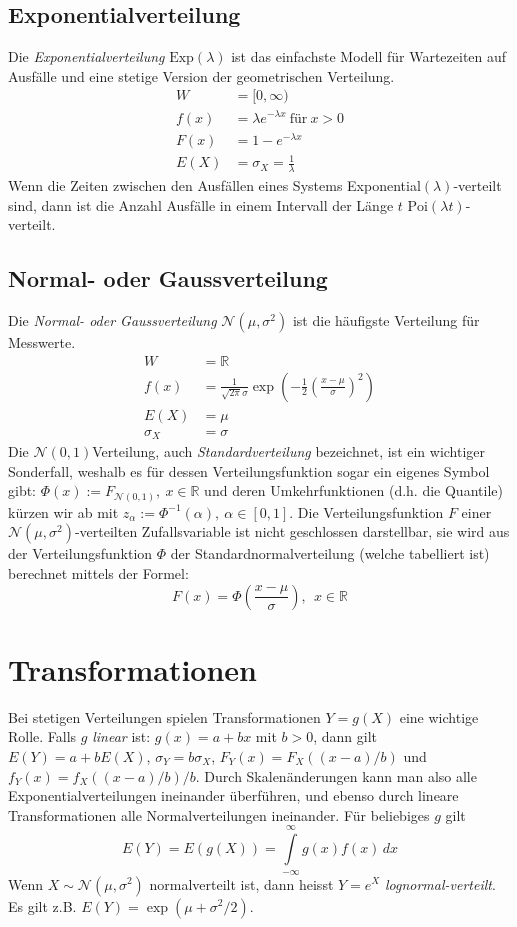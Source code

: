 \subsection{Exponentialverteilung}
Die \emph{Exponentialverteilung} $\text{Exp}(\lambda)$ ist das einfachste Modell für Wartezeiten auf Ausfälle und eine stetige Version der geometrischen Verteilung.
\begin{align}
	W&=[0,\infty)\\
	f(x)&=\lambda e^{-\lambda x} \ \text{für}\ x>0\\
	F(x)&=1-e^{-\lambda x}\\
	E(X)&=\sigma_X=\frac{1}{\lambda}
\end{align}
Wenn die Zeiten zwischen den Ausfällen eines Systems Exponential$(\lambda)$-verteilt sind, dann ist die Anzahl Ausfälle in einem Intervall der Länge $t$ $\text{Poi}(\lambda t)$-verteilt.
%
\subsection{Normal- oder Gaussverteilung}
Die \emph{Normal- oder Gaussverteilung} $\mathcal{N}(\mu,\sigma^2)$ ist die häufigste Verteilung für Messwerte.
\begin{align}
	W&=\mathbb{R}\\
	f(x)&=\frac{1}{\sqrt{2\pi}\sigma} \exp\left(-\frac{1}{2}\left(\frac{x-\mu}{\sigma}\right)^2\right)\\
	E(X)&=\mu\\
	\sigma_X&=\sigma
\end{align}
Die $\mathcal{N}(0,1)$Verteilung, auch \emph{Standardverteilung} bezeichnet, ist ein wichtiger Sonderfall, weshalb es für dessen Verteilungsfunktion sogar ein eigenes Symbol gibt: $\Phi(x) := F_{\mathcal{N}(0,1)}, \ x\in\mathbb{R}$ und deren Umkehrfunktionen (d.h. die Quantile) kürzen wir ab mit $z_\alpha := \Phi^{-1}(\alpha), \ \alpha \in [0,1]$. Die Verteilungsfunktion $F$ einer $\mathcal{N}(\mu,\sigma^2)$-verteilten Zufallsvariable ist nicht geschlossen darstellbar, sie wird aus der Verteilungsfunktion $\Phi$ der Standardnormalverteilung (welche tabelliert ist) berechnet mittels der Formel:
\begin{equation}
	F(x)=\Phi\left(\frac{x-\mu}{\sigma}\right), \ \ x \in \mathbb{R}
\end{equation}
%
\section{Transformationen}
Bei stetigen Verteilungen spielen Transformationen $Y=g(X)$ eine wichtige Rolle. Falls $g$ \emph{linear} ist: $g(x)=a+bx$ mit $b>0$, dann gilt $E(Y)=a+bE(X)$, $\sigma_Y=b\sigma_X$, $F_Y(x)=F_X((x-a)/b)$ und $f_Y(x)=f_X((x-a)/b)/b$. Durch Skalenänderungen kann man also alle Exponentialverteilungen ineinander überführen, und ebenso durch lineare Transformationen alle Normalverteilungen ineinander. Für beliebiges $g$ gilt
\begin{equation}
	E(Y)=E(g(X))=\int\limits_{-\infty}^\infty g(x)f(x)\, dx
\end{equation}
Wenn $X\sim \mathcal{N}(\mu,\sigma^2)$ normalverteilt ist, dann heisst $Y=e^X$ \emph{lognormal-verteilt}. Es gilt z.B. $E(Y)=\exp(\mu+\sigma^2/2)$.
%
